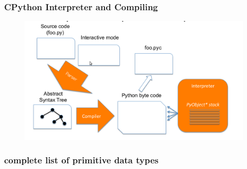 \documentclass{beamer}
\begin{document}
\begin{frame}
\frametitle{CPython Interpreter and Compiling}
	\begin{figure}
	\includegraphics[width=12cm]{Cpython.png}
	\end{figure}

\end{frame}
\begin{frame}
\frametitle{complete list of primitive data types}
\framesubtitle{}
  
\end{frame}
\end{document}
